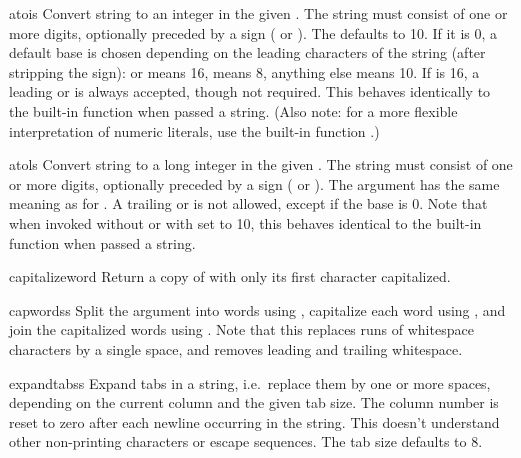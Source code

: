 \begin{funcdesc}{atoi}{s}
  Convert string  to an integer in the given .  The
  string must consist of one or more digits, optionally preceded by a
  sign (\samp{+} or \samp{-}).  The  defaults to 10.  If it
  is 0, a default base is chosen depending on the leading characters
  of the string (after stripping the sign):  or 
  means 16,  means 8, anything else means 10.  If 
  is 16, a leading  or  is always accepted, though
  not required.  This behaves identically to the built-in function
   when passed a string.  (Also note: for a more
  flexible interpretation of numeric literals, use the built-in
  function .)
\end{funcdesc}

\begin{funcdesc}{atol}{s}
  Convert string  to a long integer in the given .
  The string must consist of one or more digits, optionally preceded
  by a sign (\samp{+} or \samp{-}).  The  argument has the
  same meaning as for .  A trailing  or
   is not allowed, except if the base is 0.  Note that when
  invoked without  or with  set to 10, this
  behaves identical to the built-in function
   when passed a string.
\end{funcdesc}

\begin{funcdesc}{capitalize}{word}
  Return a copy of  with only its first character capitalized.
\end{funcdesc}

\begin{funcdesc}{capwords}{s}
  Split the argument into words using , capitalize
  each word using , and join the capitalized
  words using .  Note that this replaces runs of
  whitespace characters by a single space, and removes leading and
  trailing whitespace.
\end{funcdesc}

\begin{funcdesc}{expandtabs}{s}
  Expand tabs in a string, i.e.\ replace them by one or more spaces,
  depending on the current column and the given tab size.  The column
  number is reset to zero after each newline occurring in the string.
  This doesn't understand other non-printing characters or escape
  sequences.  The tab size defaults to 8.
\end{funcdesc}

